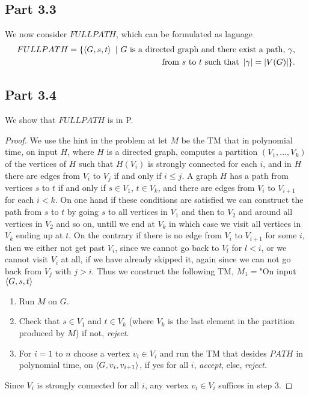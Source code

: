 \documentclass[a4paper,11pt]{article}
\newcommand{\abs}[1]{\left\lvert #1 \right\rvert}
\newcommand{\pipe}{\ \vert \ }
\numberwithin{equation}{section}
\begin{document}
	\subsection*{Part 3.3}
	We now consider $ FULLPATH $, which can be formulated as laguage \begin{equation}
	\begin{aligned}
	FULLPATH=\{\braket{G,s,t}\pipe G\text{ is a directed graph and there exist a path, $ \gamma $,}\\\text{ from $ s $ to $ t $ such that }\abs{\gamma}=\abs{V(G)}\}.
	\end{aligned}
	\end{equation}
	\subsection*{Part 3.4}
	We show that $ FULLPATH $ is in P.
	\begin{proof}
		We use the hint in the problem at let $ M $ be the TM that in polynomial time, on input $ H $, where $ H $ is a directed graph, computes a partition $ (V_1,...,V_k) $ of the vertices of $ H $ such that $ H(V_i) $ is strongly connected for each $ i $, and in $ H $ there are edges from $ V_i $ to $ V_j $ if and only if $ i\leq j $. A graph $ H $ has a path from vertices $ s $ to $ t $ if and only if $ s\in V_1 $, $ t\in V_k $, and there are edges from $ V_i $ to $ V_{i+1} $ for each $ i<k $. On one hand if these conditions are satisfied we can construct the path from $ s $ to $ t $ by going $ s $ to all vertices in $ V_1 $ and then to $ V_2 $ and around all vertices in $ V_2 $ and so on, untill we end at $ V_k $ in which case we visit all vertices in $ V_k $ ending up at $ t $. On the contrary if there is no edge from $ V_i $ to $ V_{i+1} $ for some $ i $, then we either not get past $ V_i $, since we cannot go back to $ V_l $ for $ l<i $, or we cannot visit $ V_i $ at all, if we have already skipped it, again since we can not go back from $ V_j $ with $ j>i $. Thus we construct the following TM, $ M_1= $"On input $ \braket{G,s,t} $
		\begin{enumerate}
			\item Run $ M $ on $ G $.
			\item Check that $ s\in V_1 $ and $ t\in V_k $ (where $ V_k $ is the last element in the partition produced by $ M $) if not, \emph{reject}.
			\item For $ i=1 $ to $ n $ choose a vertex $ v_i\in V_i $ and run the TM that desides $ PATH $ in polynomial time, on $ \braket{G,v_i,v_{i+1}} $, if yes for all $ i $, \emph{accept}, else, \emph{reject.}  
		\end{enumerate}
		Since $ V_i $ is strongly connected for all $ i $, any vertex $v_i\in V_i  $ suffices in step $ 3 $.
	\end{proof} 
	
\end{document}
